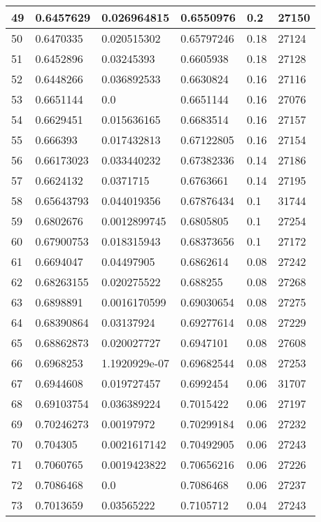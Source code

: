 \begin{longtable}{|l|l|l|l|l|l|}
49 & 0.6457629 & 0.026964815 & 0.6550976 & 0.2 & 27150 \\ \hline 
50 & 0.6470335 & 0.020515302 & 0.65797246 & 0.18 & 27124 \\ \hline 
51 & 0.6452896 & 0.03245393 & 0.6605938 & 0.18 & 27128 \\ \hline 
52 & 0.6448266 & 0.036892533 & 0.6630824 & 0.16 & 27116 \\ \hline 
53 & 0.6651144 & 0.0 & 0.6651144 & 0.16 & 27076 \\ \hline 
54 & 0.6629451 & 0.015636165 & 0.6683514 & 0.16 & 27157 \\ \hline 
55 & 0.666393 & 0.017432813 & 0.67122805 & 0.16 & 27154 \\ \hline 
56 & 0.66173023 & 0.033440232 & 0.67382336 & 0.14 & 27186 \\ \hline 
57 & 0.6624132 & 0.0371715 & 0.6763661 & 0.14 & 27195 \\ \hline 
58 & 0.65643793 & 0.044019356 & 0.67876434 & 0.1 & 31744 \\ \hline 
59 & 0.6802676 & 0.0012899745 & 0.6805805 & 0.1 & 27254 \\ \hline 
60 & 0.67900753 & 0.018315943 & 0.68373656 & 0.1 & 27172 \\ \hline 
61 & 0.6694047 & 0.04497905 & 0.6862614 & 0.08 & 27242 \\ \hline 
62 & 0.68263155 & 0.020275522 & 0.688255 & 0.08 & 27268 \\ \hline 
63 & 0.6898891 & 0.0016170599 & 0.69030654 & 0.08 & 27275 \\ \hline 
64 & 0.68390864 & 0.03137924 & 0.69277614 & 0.08 & 27229 \\ \hline 
65 & 0.68862873 & 0.020027727 & 0.6947101 & 0.08 & 27608 \\ \hline 
66 & 0.6968253 & 1.1920929e-07 & 0.69682544 & 0.08 & 27253 \\ \hline 
67 & 0.6944608 & 0.019727457 & 0.6992454 & 0.06 & 31707 \\ \hline 
68 & 0.69103754 & 0.036389224 & 0.7015422 & 0.06 & 27197 \\ \hline 
69 & 0.70246273 & 0.00197972 & 0.70299184 & 0.06 & 27232 \\ \hline 
70 & 0.704305 & 0.0021617142 & 0.70492905 & 0.06 & 27243 \\ \hline 
71 & 0.7060765 & 0.0019423822 & 0.70656216 & 0.06 & 27226 \\ \hline 
72 & 0.7086468 & 0.0 & 0.7086468 & 0.06 & 27237 \\ \hline 
73 & 0.7013659 & 0.03565222 & 0.7105712 & 0.04 & 27243 \\ \hline 

\end{longtable}
